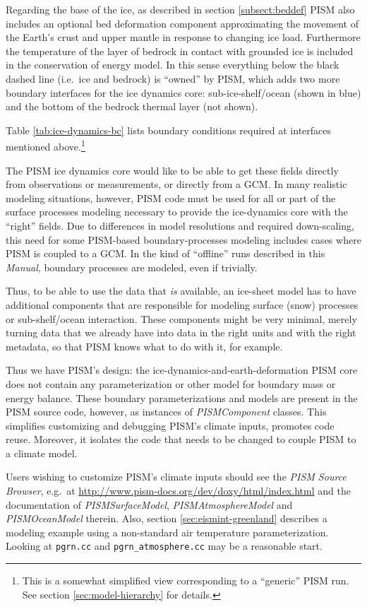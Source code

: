 \documentclass[titlepage,letterpaper,final]{scrartcl}
\begin{document}
Regarding the base of the ice, as described in section \ref{subsect:beddef} PISM also includes an optional bed deformation component approximating the movement of the Earth's crust and upper mantle in response to changing ice load.   Furthermore the temperature of the layer of bedrock in contact with grounded ice is included in the conservation of energy model.  In this sense everything below the black dashed line (i.e.~ice and bedrock) is ``owned'' by PISM, which adds two more boundary interfaces for the ice dynamics core: sub-ice-shelf/ocean (shown in blue) and the bottom of the bedrock thermal layer (not shown).

Table \ref{tab:ice-dynamics-bc} lists boundary conditions required at
interfaces mentioned above.\footnote{This is a somewhat simplified view  corresponding to a ``generic'' PISM run.   See section \ref{sec:model-hierarchy} for details.}

The PISM ice dynamics core would like to be able to get these fields directly from observations or measurements, or directly from a GCM.  In many realistic modeling situations, however, PISM code must be used for all or part of the surface processes modeling necessary to provide the ice-dynamics core with the ``right'' fields.  Due to differences in model resolutions and required down-scaling, this need for some PISM-based boundary-processes modeling includes cases where PISM is coupled to a GCM.  In the kind of ``offline'' runs described in this \emph{Manual}, boundary processes are modeled, even if trivially.

Thus, to be able to use the data that \emph{is} available, an ice-sheet model has to
have additional components that are responsible for modeling surface (snow)
processes or sub-shelf/ocean interaction.  These components might be very minimal, merely turning data that we already have into data in the right units and with the right metadata, so that PISM knows what to do with it, for example.

Thus we have PISM's design: the ice-dynamics-and-earth-deformation PISM
core does not contain any parameterization or other model for boundary mass or
energy balance.  These boundary parameterizations and models are present in the PISM source code, however, as instances of \emph{PISMComponent} classes.  This simplifies customizing and debugging PISM's climate
inputs, promotes code reuse.  Moreover, it isolates the code that needs to be changed to
couple PISM to a climate model.

Users wishing to customize PISM's climate inputs should see the \emph{PISM
  Source Browser}, e.g.~at
\url{http://www.pism-docs.org/dev/doxy/html/index.html} and the documentation
of \emph{PISMSurfaceModel}, \emph{PISMAtmosphereModel} and
\emph{PISMOceanModel} therein.  Also, section \ref{sec:eismint-greenland} describes a
modeling example using a non-standard air temperature parameterization. Looking
at \texttt{pgrn.cc} and \texttt{pgrn_atmosphere.cc} may be a reasonable
start.
\end{document}
